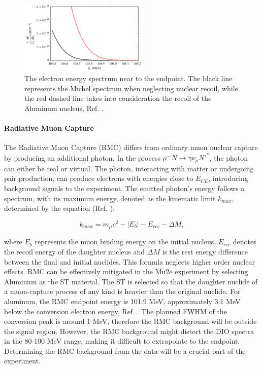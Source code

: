 \begin{figure}[!h]
\centering
\includegraphics[width =0.55\textwidth]{figures/png/Screenshot_20240222_175644.png}
\caption{The electron energy spectrum near to the endpoint. The black line 
represents the Michel spectrum when neglecting nuclear recoil, while the red 
dashed line takes into consideration the recoil of the Aluminum nucleus, Ref. 
\cite{PhysRevD.84.013006}.}
\label{fig:micheldiff}
\end{figure}
\paragraph{Radiative Muon Capture}

The Radiative Muon Capture (RMC) differs from ordinary muon nuclear capture by 
producing an additional photon. In the process $\mu^- N \rightarrow\gamma \nu_\mu N'^* $, 
the photon can either be real or virtual. The photon, interacting with matter or 
undergoing pair production, can produce electrons with energies close to $E_{CE}$, 
introducing background signals to the experiment. The emitted photon's energy follows 
a spectrum, with its maximum energy, denoted as the kinematic limit $k_{max}$, 
determined by the equation (Ref. \cite{bartoszek2015mu2e}):

\begin{equation}
k_{max} = m_\mu c^2 - |E_b| - E_{rec} - \Delta M ,
\end{equation}

where $E_b$ represents the muon binding energy on the initial nucleus, $E_{rec}$ denotes 
the recoil energy of the daughter nucleus and $\Delta M$ is the rest energy difference 
between the final and initial nuclides. This formula neglects higher order nuclear effects. 
RMC can be effectively mitigated in the Mu2e experiment by selecting Aluminum as the ST material. The ST is selected so that the daughter nuclide of a muon-capture 
process of any kind is heavier than the original nuclide. For aluminum, the RMC endpoint energy 
is 101.9 MeV, approximately 3.1 MeV below the conversion electron energy, Ref. 
\cite{bartoszek2015mu2e}. 
The planned FWHM of the conversion peak is around 1 MeV, therefore the RMC background will be 
outside the signal region. However, the RMC background might distort the DIO spectra 
in the 80-100 MeV 
range, making it difficult to extrapolate to the endpoint. Determining the RMC 
background from the data will be a crucial part of the experiment.
